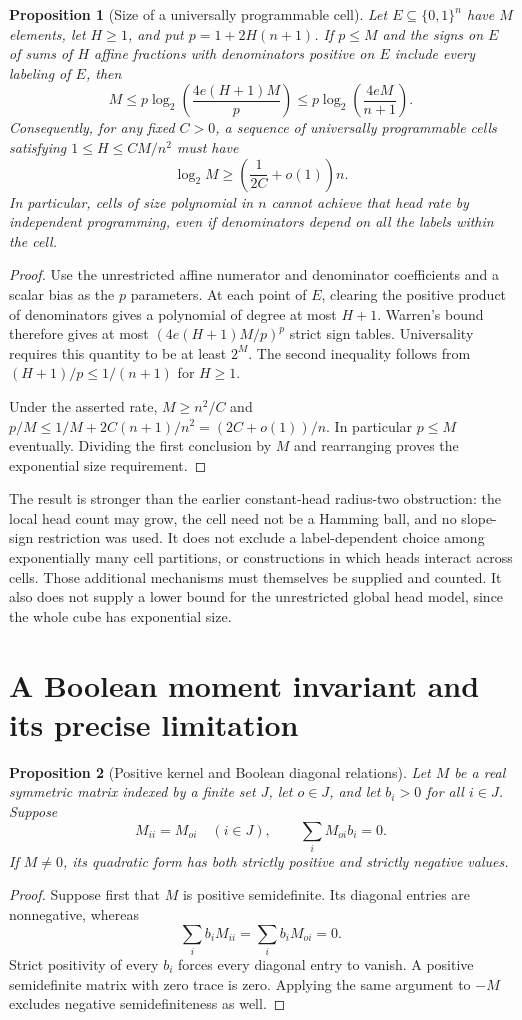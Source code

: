 \documentclass[11pt]{article}
\newtheorem{proposition}{Proposition}
\begin{document}
\begin{proposition}[Size of a universally programmable cell]
Let $E\subseteq\{0,1\}^n$ have $M$ elements, let $H\ge1$, and put
$p=1+2H(n+1)$. If $p\le M$ and the signs on $E$ of sums of $H$
affine fractions with denominators positive on $E$ include every
labeling of $E$, then
\[
 M\le p\log_2\left(\frac{4e(H+1)M}{p}\right)
 \le p\log_2\left(\frac{4eM}{n+1}\right).
\]
Consequently, for any fixed $C>0$, a sequence of universally
programmable cells satisfying $1\le H\le CM/n^2$ must have
\[
 \log_2 M\ge\left(\frac1{2C}+o(1)\right)n.
\]
In particular, cells of size polynomial in $n$ cannot achieve that
head rate by independent programming, even if denominators depend
on all the labels within the cell.
\end{proposition}
\begin{proof}
Use the unrestricted affine numerator and denominator coefficients
and a scalar bias as the $p$ parameters. At each point of $E$,
clearing the positive product of denominators gives a polynomial
of degree at most $H+1$. Warren's bound therefore gives at most
$(4e(H+1)M/p)^p$ strict sign tables. Universality requires this
quantity to be at least $2^M$. The second inequality follows from
$(H+1)/p\le1/(n+1)$ for $H\ge1$.

Under the asserted rate, $M\ge n^2/C$ and
$p/M\le1/M+2C(n+1)/n^2=(2C+o(1))/n$.
In particular $p\le M$ eventually. Dividing the first conclusion
by $M$ and rearranging proves the exponential size requirement.
\end{proof}

The result is stronger than the earlier constant-head radius-two
obstruction: the local head count may grow, the cell need not be a
Hamming ball, and no slope-sign restriction was used. It does not
exclude a label-dependent choice among exponentially many cell
partitions, or constructions in which heads interact across cells.
Those additional mechanisms must themselves be supplied and counted.
It also does not supply a lower bound for the unrestricted global
head model, since the whole cube has exponential size.


\section{A Boolean moment invariant and its precise limitation}

\begin{proposition}[Positive kernel and Boolean diagonal relations]
Let $M$ be a real symmetric matrix indexed by a finite set $J$, let
$o\in J$, and let $b_i>0$ for all $i\in J$. Suppose
\[
 M_{ii}=M_{oi}\quad(i\in J),\qquad
 \sum_i M_{oi}b_i=0.
\]
If $M\ne0$, its quadratic form has both strictly positive and strictly
negative values.
\end{proposition}
\begin{proof}
Suppose first that $M$ is positive semidefinite. Its diagonal entries
are nonnegative, whereas
\[
 \sum_i b_i M_{ii}=\sum_i b_i M_{oi}=0.
\]
Strict positivity of every $b_i$ forces every diagonal entry to vanish.
A positive semidefinite matrix with zero trace is zero. Applying the
same argument to $-M$ excludes negative semidefiniteness as well.
\end{proof}
\end{document}
